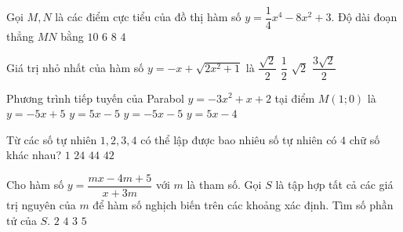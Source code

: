\begin{ex}%
Gọi $M, N$ là các điểm cực tiểu của đồ thị hàm số $y = \dfrac {1}{4}{x^4}-8{x^2}+3.$ Độ dài đoạn thẳng $MN$ bằng
\choice
{$10$}
{$6$}
{\True $8$}
{$4$}
\end{ex}

\begin{ex}%
Giá trị nhỏ nhất của hàm số $y =-x+\sqrt {2{x^2}+1}$ là
\choice
{\True $\dfrac {\sqrt 2}{2}$}
{$\dfrac {1}{2}$}
{$\sqrt 2$}
{$\dfrac {{3\sqrt 2}}{2}$}
\end{ex}

\begin{ex}%
Phương trình tiếp tuyến của Parabol $y =-3{x^2}+x+2$ tại điểm $M(1; 0)$ là
\choice
{\True $y =-5x+5$}
{$y = 5x-5$}
{$y =-5x-5$}
{$y = 5x-4$}
\end{ex}

\begin{ex}%
Từ các số tự nhiên $ 1, 2, 3, 4 $ có thể lập được bao nhiêu số tự nhiên có $  4 $ chữ số khác nhau?
\choice
{$1$}
{\True $24$}
{$44$}
{$42$}
\end{ex}

\begin{ex}%
Cho hàm số $y = \dfrac {{mx-4m+5}}{{x+3m}}$ với $m$ là tham số. Gọi $S$ là tập hợp tất cả các giá trị nguyên của $m$ để hàm số nghịch biến trên các khoảng xác định. Tìm số phần tử của $S.$
\choice
{$2$}
{$4$}
{\True $3$}
{$5$}
\end{ex}

